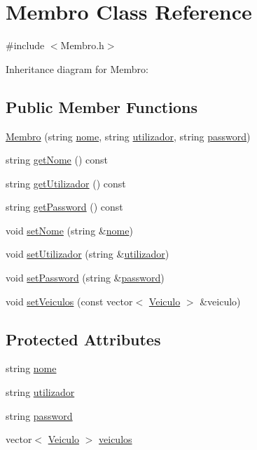 \hypertarget{class_membro}{\section{Membro Class Reference}
\label{class_membro}
}


{\ttfamily \#include $<$Membro.\+h$>$}



Inheritance diagram for Membro\+:
\subsection*{Public Member Functions}
\begin{DoxyCompactItemize}
\item 
\hyperlink{class_membro_a2dc48d0c0febf2d3270128734bdce7d0}{Membro} (string \hyperlink{class_membro_a2598bbe34ae32a98f41468b2202a9555}{nome}, string \hyperlink{class_membro_a42cc733ff94ec8d1bbfdacc62dfbb0e7}{utilizador}, string \hyperlink{class_membro_ae2b12fc3e91efc674c07e735edf4ac21}{password})
\item 
string \hyperlink{class_membro_af7cfd42d45960183ccf1002246cb0bd2}{get\+Nome} () const 
\item 
string \hyperlink{class_membro_ae124b54c2b8572e531c873788263222d}{get\+Utilizador} () const 
\item 
string \hyperlink{class_membro_af9c84eb5f83b1fd64d4c542f419d6953}{get\+Password} () const 
\item 
void \hyperlink{class_membro_a87f95f3869ef8ce4cfaf673cff30cdcc}{set\+Nome} (string \&\hyperlink{class_membro_a2598bbe34ae32a98f41468b2202a9555}{nome})
\item 
void \hyperlink{class_membro_ac0ce078ab4d7d5a72e370ea6335e8eef}{set\+Utilizador} (string \&\hyperlink{class_membro_a42cc733ff94ec8d1bbfdacc62dfbb0e7}{utilizador})
\item 
void \hyperlink{class_membro_ab5a7b1734090d146bb39f8cfa52be006}{set\+Password} (string \&\hyperlink{class_membro_ae2b12fc3e91efc674c07e735edf4ac21}{password})
\item 
void \hyperlink{class_membro_ab40d72d229c4147372bd747d66176f55}{set\+Veiculos} (const vector$<$ \hyperlink{class_veiculo}{Veiculo} $>$ \&veiculo)
\end{DoxyCompactItemize}
\subsection*{Protected Attributes}
\begin{DoxyCompactItemize}
\item 
string \hyperlink{class_membro_a2598bbe34ae32a98f41468b2202a9555}{nome}
\item 
string \hyperlink{class_membro_a42cc733ff94ec8d1bbfdacc62dfbb0e7}{utilizador}
\item 
string \hyperlink{class_membro_ae2b12fc3e91efc674c07e735edf4ac21}{password}
\item 
vector$<$ \hyperlink{class_veiculo}{Veiculo} $>$ \hyperlink{class_membro_a7485fc8a9f992a05662866f19b22f74a}{veiculos}
\end{DoxyCompactItemize}


